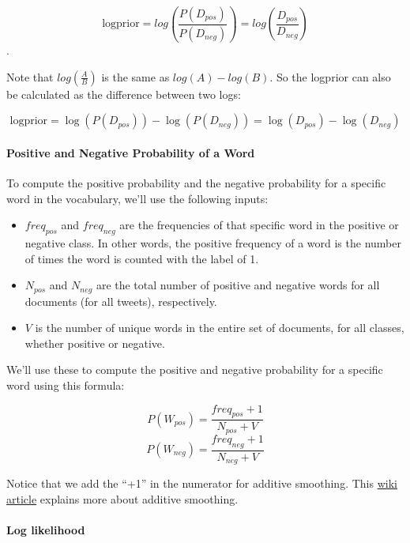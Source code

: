 \documentclass[11pt]{article}
\providecommand{\tightlist}{%
      \setlength{\itemsep}{0pt}\setlength{\parskip}{0pt}}
\begin{document}
\[\text{logprior} = log \left( \frac{P(D_{pos})}{P(D_{neg})} \right) = log \left( \frac{D_{pos}}{D_{neg}} \right)\].

Note that \(log(\frac{A}{B})\) is the same as \(log(A) - log(B)\). So
the logprior can also be calculated as the difference between two logs:

\[\text{logprior} = \log (P(D_{pos})) - \log (P(D_{neg})) = \log (D_{pos}) - \log (D_{neg})\tag{3}\]

    \hypertarget{positive-and-negative-probability-of-a-word}{%
\paragraph{Positive and Negative Probability of a
Word}\label{positive-and-negative-probability-of-a-word}}

To compute the positive probability and the negative probability for a
specific word in the vocabulary, we'll use the following inputs:

\begin{itemize}
\tightlist
\item
  \(freq_{pos}\) and \(freq_{neg}\) are the frequencies of that specific
  word in the positive or negative class. In other words, the positive
  frequency of a word is the number of times the word is counted with
  the label of 1.
\item
  \(N_{pos}\) and \(N_{neg}\) are the total number of positive and
  negative words for all documents (for all tweets), respectively.
\item
  \(V\) is the number of unique words in the entire set of documents,
  for all classes, whether positive or negative.
\end{itemize}

We'll use these to compute the positive and negative probability for a
specific word using this formula:

\[ P(W_{pos}) = \frac{freq_{pos} + 1}{N_{pos} + V}\tag{4} \]
\[ P(W_{neg}) = \frac{freq_{neg} + 1}{N_{neg} + V}\tag{5} \]

Notice that we add the ``+1'' in the numerator for additive smoothing.
This \href{https://en.wikipedia.org/wiki/Additive_smoothing}{wiki
article} explains more about additive smoothing.

    \hypertarget{log-likelihood}{%
\paragraph{Log likelihood}\label{log-likelihood}}
\end{document}
